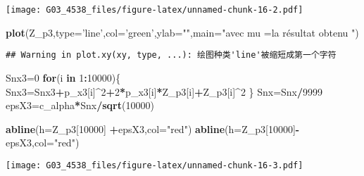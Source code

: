 \documentclass[]{article}
\newenvironment{Shaded}{\begin{snugshade}}{\end{snugshade}}
\newcommand{\KeywordTok}[1]{\textcolor[rgb]{0.13,0.29,0.53}{\textbf{#1}}}
\newcommand{\DataTypeTok}[1]{\textcolor[rgb]{0.13,0.29,0.53}{#1}}
\newcommand{\DecValTok}[1]{\textcolor[rgb]{0.00,0.00,0.81}{#1}}
\newcommand{\StringTok}[1]{\textcolor[rgb]{0.31,0.60,0.02}{#1}}
\newcommand{\ControlFlowTok}[1]{\textcolor[rgb]{0.13,0.29,0.53}{\textbf{#1}}}
\newcommand{\OperatorTok}[1]{\textcolor[rgb]{0.81,0.36,0.00}{\textbf{#1}}}
\newcommand{\NormalTok}[1]{#1}
\begin{document}
\texttt{[image: G03\_4538\_files/figure-latex/unnamed-chunk-16-2.pdf]}

\begin{Shaded}
\begin{Highlighting}[]
\KeywordTok{plot}\NormalTok{(Z_p3,}\DataTypeTok{type=}\StringTok{'line'}\NormalTok{,}\DataTypeTok{col=}\StringTok{'green'}\NormalTok{,}\DataTypeTok{ylab=}\StringTok{""}\NormalTok{,}\DataTypeTok{main=}\StringTok{"avec mu =la résultat obtenu "}\NormalTok{)}
\end{Highlighting}
\end{Shaded}

\begin{verbatim}
## Warning in plot.xy(xy, type, ...): 绘图种类'line'被缩短成第一个字符
\end{verbatim}

\begin{Shaded}
\begin{Highlighting}[]
\NormalTok{Snx3=}\DecValTok{0}  
\ControlFlowTok{for}\NormalTok{(i }\ControlFlowTok{in} \DecValTok{1}\OperatorTok{:}\DecValTok{10000}\NormalTok{)\{}
\NormalTok{  Snx3=Snx3}\OperatorTok{+}\NormalTok{p_x3[i]}\OperatorTok{^}\DecValTok{2}\OperatorTok{+}\DecValTok{2}\OperatorTok{*}\NormalTok{p_x3[i]}\OperatorTok{*}\NormalTok{Z_p3[i]}\OperatorTok{+}\NormalTok{Z_p3[i]}\OperatorTok{^}\DecValTok{2}
\NormalTok{\}}
\NormalTok{Snx=Snx}\OperatorTok{/}\DecValTok{9999}
\NormalTok{epsX3=c_alpha}\OperatorTok{*}\NormalTok{Snx}\OperatorTok{/}\KeywordTok{sqrt}\NormalTok{(}\DecValTok{10000}\NormalTok{)}

\KeywordTok{abline}\NormalTok{(}\DataTypeTok{h=}\NormalTok{Z_p3[}\DecValTok{10000}\NormalTok{] }\OperatorTok{+}\NormalTok{epsX3,}\DataTypeTok{col=}\StringTok{"red"}\NormalTok{)}
\KeywordTok{abline}\NormalTok{(}\DataTypeTok{h=}\NormalTok{Z_p3[}\DecValTok{10000}\NormalTok{]}\OperatorTok{-}\NormalTok{epsX3,}\DataTypeTok{col=}\StringTok{"red"}\NormalTok{)}
\end{Highlighting}
\end{Shaded}

\texttt{[image: G03\_4538\_files/figure-latex/unnamed-chunk-16-3.pdf]}
\end{document}
